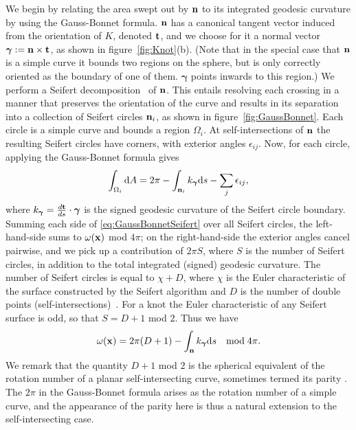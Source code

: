     We begin by relating the area swept out by ${\bf n}$ to its integrated geodesic curvature by using the Gauss-Bonnet formula. ${\bf n}$ has a canonical tangent vector induced from the orientation of $K$, denoted $\bf t$, and we choose for it a normal vector $\boldsymbol \gamma := \bf n \times \bf t$, as shown in figure~\ref{fig:Knot}(b). (Note that in the special case that ${\bf n}$ is a simple curve it bounds two regions on the sphere, but is only correctly oriented as the boundary of one of them. ${\boldsymbol \gamma}$ points inwards to this region.) We perform a Seifert decomposition~\citep{Adams2004} of ${\bf n}$. This entails resolving each crossing in a manner that preserves the orientation of the curve and results in its separation into a collection of Seifert circles ${\bf n}_i$, as shown in figure~\ref{fig:GaussBonnet}. Each circle is a simple curve and bounds a region $\Omega_i$. At self-intersections of ${\bf n}$ the resulting Seifert circles have corners, with exterior angles $\epsilon_{ij}$. Now, for each circle, applying the Gauss-Bonnet formula \citep{Lee1996} gives 
    \begin{equation}
        \int_{\Omega_i} \mathrm{d} A  = 2 \pi - \int_{{\bf n}_i} k_{\boldsymbol \gamma} \mathrm{d} s - \sum_j \epsilon_{ij} ,
        \label{eq:GaussBonnetSeifert}
    \end{equation}
    where $k_{\boldsymbol \gamma} = \frac{d {\bf t}}{d s} \cdot {\boldsymbol \gamma}$ is the signed geodesic curvature of the Seifert circle boundary. Summing each side of \eqref{eq:GaussBonnetSeifert} over all Seifert circles, the left-hand-side sums to $\omega({\bf x})$ mod $4\pi$; on the right-hand-side the exterior angles cancel pairwise, and we pick up a contribution of $2\pi S$, where $S$ is the number of Seifert circles, in addition to the total integrated (signed) geodesic curvature. The number of Seifert circles is equal to $\chi + D$, where $\chi$ is the Euler characteristic of the surface constructed by the Seifert algorithm and $D$ is the number of double points (self-intersections)~\citep{Adams2004,Lickorish1997}. For a knot the Euler characteristic of any Seifert surface is odd, so that $S = D+1$ mod $2$. Thus we have
    \begin{equation}
        \omega({\bf x})  = 2 \pi (D + 1) - \int_{{\bf n}} k_{\boldsymbol \gamma} \mathrm{d}s\quad\textrm{mod}\; 4\pi .
        \label{eq:GaussBonnetImmersed}
    \end{equation} 
    We remark that the quantity $D+1$ mod $2$ is the spherical equivalent of the rotation number of a planar self-intersecting curve, sometimes termed its parity \citep{Whitney1937,Phillips1966,Solomon1996}. The $2 \pi$ in the Gauss-Bonnet formula arises as the rotation number of a simple curve, and the appearance of the parity here is thus a natural extension to the self-intersecting case. 

